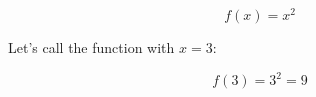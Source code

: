 \iffalse

Q. Define a function and call in tex.

\fi

\begin{equation}
f(x) = x^2
\end{equation}

Let's call the function with $x=3$:

\begin{equation}
f(3) = 3^2 = 9
\end{equation}